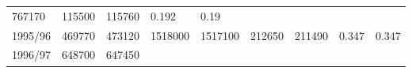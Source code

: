 \documentclass[
  spanish,
]{article}
\begin{document}
\begin{longtable}[]{@{}lllllllll@{}}
\begin{minipage}[t]{0.10\columnwidth}
767170\strut
\end{minipage} & \begin{minipage}[t]{0.08\columnwidth}\raggedright
115500\strut
\end{minipage} & \begin{minipage}[t]{0.09\columnwidth}\raggedright
115760\strut
\end{minipage} & \begin{minipage}[t]{0.08\columnwidth}\raggedright
0.192\strut
\end{minipage} & \begin{minipage}[t]{0.09\columnwidth}\raggedright
0.19\strut
\end{minipage}\tabularnewline
\begin{minipage}[t]{0.06\columnwidth}\raggedright
1995/96\strut
\end{minipage} & \begin{minipage}[t]{0.09\columnwidth}\raggedright
469770\strut
\end{minipage} & \begin{minipage}[t]{0.10\columnwidth}\raggedright
473120\strut
\end{minipage} & \begin{minipage}[t]{0.09\columnwidth}\raggedright
1518000\strut
\end{minipage} & \begin{minipage}[t]{0.10\columnwidth}\raggedright
1517100\strut
\end{minipage} & \begin{minipage}[t]{0.08\columnwidth}\raggedright
212650\strut
\end{minipage} & \begin{minipage}[t]{0.09\columnwidth}\raggedright
211490\strut
\end{minipage} & \begin{minipage}[t]{0.08\columnwidth}\raggedright
0.347\strut
\end{minipage} & \begin{minipage}[t]{0.09\columnwidth}\raggedright
0.347\strut
\end{minipage}\tabularnewline
\begin{minipage}[t]{0.06\columnwidth}\raggedright
1996/97\strut
\end{minipage} & \begin{minipage}[t]{0.09\columnwidth}\raggedright
648700\strut
\end{minipage} & \begin{minipage}[t]{0.10\columnwidth}\raggedright
647450\strut
\end{minipage} & \begin{minipage}[t]{0.09\columnwidth}\raggedright

\end{minipage}
\end{longtable}
\end{document}
